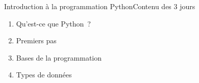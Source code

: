 \documentclass{beamer}
\begin{document}
    \begin{frame}{Introduction à la programmation Python}{Contenu des 3 jours}
        \begin{multicols}{3}
            \begin{tiny}
                \begin{enumerate}
                    \item Qu'est-ce que Python~?
                    \item Premiers pas
                    \begin{itemize}
                    \end{itemize}

                    \item Bases de la programmation
                    \begin{itemize}
                    \end{itemize}

                    \item Types de données
                    \begin{itemize}
                    \end{itemize}


\end{enumerate}
\end{tiny}
\end{multicols}
\end{frame}
\end{document}
